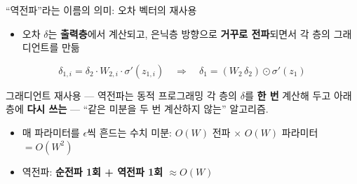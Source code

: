 \begin{frame}{``역전파''라는 이름의 의미: 오차 벡터의 재사용}
  \begin{itemize}
    \item 오차 $\delta$는 \textbf{출력층}에서 계산되고, 은닉층 방향으로
      \textbf{거꾸로 전파}되면서 각 층의 그래디언트를 만듦
  \end{itemize}
  \[
  \delta_{1,i}
  = \delta_2 \cdot W_{2,i} \cdot \sigma'(z_{1,i})
  \quad \Longrightarrow \quad
  \delta_1 = (W_2 \, \delta_2) \odot \sigma'(z_1)
  \]
  \begin{block}{그래디언트 재사용 — 역전파는 동적 프로그래밍}
    각 층의 $\delta$를 \textbf{한 번} 계산해 두고 아래 층에 \textbf{다시 쓰는} —
    ``같은 미분을 두 번 계산하지 않는'' 알고리즘.
  \end{block}
  \begin{itemize}\small
    \item 매 파라미터를 $\epsilon$씩 흔드는 수치 미분: $O(W)$ 전파 $\times$ $O(W)$
      파라미터 $= O(W^2)$
    \item 역전파: \textbf{순전파 1회 + 역전파 1회 $\approx O(W)$}
  \end{itemize}
\end{frame}
